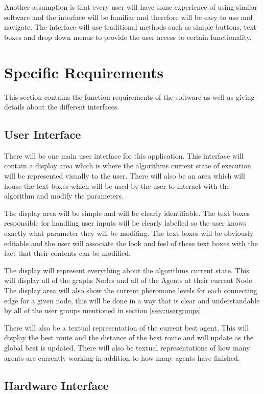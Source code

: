 \documentclass[10pt,a4paper]{article}
\begin{document}
Another assumption is that every user will have some experience of using similar software and the interface will be familiar and therefore will be easy to use and navigate. The interface will use traditional methods such as simple buttons, text boxes and drop down menus to provide the user access to certain functionality.

\section{Specific Requirements}

This section contains the function requirements of the software as well as giving details about the different interfaces.

\subsection{User Interface}

There will be one main user interface for this application. This interface will contain a display area which is where the algorithms current state of execution will be represented visually to the user. There will also be an area which will house the text boxes which will be used by the user to interact with the algorithm and modify the parameters.

The display area will be simple and will be clearly identifiable. The text boxes responsible for handling user inputs will be clearly labelled so the user knows exactly what parameter they will be modifing. The text boxes will be obviously editable and the user will associate the look and feel of these text boxes with the fact that their contents can be modified.

The display will represent everything about the algorithms current state. This will display all of the graphs Nodes and all of the Agents at their current Node. The display area will also show the current pheromone levels for each connecting edge for a given node, this will be done in a way that is clear and understandable by all of the user groups mentioned in section \ref{ssec:usergroups}.

There will also be a textual representation of the current best agent. This will display the best route and the distance of the best route and will update as the global best is updated. There will also be textual representations of how many agents are currently working in addition to how many agents have finished.

\subsection{Hardware Interface}
\end{document}
